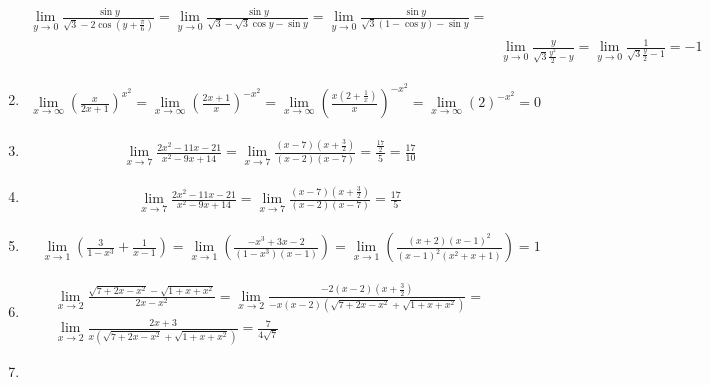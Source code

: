 \documentclass{article}
\begin{document}
\begin{enumerate}
\begin{align*}
        \lim\limits_{y \to 0}{\frac{\sin y}{\sqrt{3} - 2\cos (y + \frac{\pi}{6})}} =
        \lim\limits_{y \to 0}{\frac{\sin y}{\sqrt{3} - \sqrt{3}\cos y - \sin y}} = 
        \lim\limits_{y \to 0}{\frac{\sin y}{\sqrt{3}(1 - \cos y) - \sin y}} = \\
        &\lim\limits_{y \to 0}{\frac{ y}{\sqrt{3}\frac{y^{2}}{2} - y}} =
        \lim\limits_{y \to 0}{\frac{ 1}{\sqrt{3}\frac{y}{2} - 1}} = -1
    \end{align*}
    \item 
    \begin{align*}
       \lim\limits_{x \to \infty}{\left(\frac{x}{2x + 1}\right)^{x^{2}}} = \lim\limits_{x \to \infty}{\left(\frac{2x + 1}{x}\right)^{-x^{2}}} = \lim\limits_{x \to \infty}{\left(\frac{x(2 + \frac{1}{x})}{x}\right)^{-x^{2}}} = \lim\limits_{x \to \infty}{\left(2\right)^{-x^{2}}} = 0
    \end{align*}
    \item 
    \begin{align*}
        & \lim\limits_{x \to 7}{\frac{2 x^{2} - 11x - 21}{x^{2} - 9x + 14}} = 
         \lim\limits_{x \to 7}{\frac{(x - 7)(x + \frac{3}{2})}{(x - 2)(x - 7)}} = \frac{\frac{17}{2}}{5} = \frac{17}{10}
    \end{align*}
    \item 
    \begin{align*}
        & \lim\limits_{x \to 7}{\frac{2x^{2} - 11x - 21}{x^{2} - 9x + 14}} = \lim\limits_{x \to 7}{\frac{(x - 7)(x + \frac{3}{2})}{(x - 2)(x - 7)}} = \frac{17}{5}
    \end{align*}
    \item 
    \begin{align*}
        &\lim\limits_{x \to 1}{(\frac{3}{1 - x^{3}} + \frac{1}{x - 1})} =
        \lim\limits_{x \to 1}{(\frac{-x^{3} + 3x - 2}{(1 - x^{3})(x - 1)})} =
        \lim\limits_{x \to 1}{(\frac{(x + 2)(x - 1)^{2}}{(x - 1)^{2}(x^{2}+ x + 1)})} = 1
    \end{align*}
    \item 
    \begin{align*}
        &\lim\limits_{x \to 2}{\frac{\sqrt{7 + 2x - x^{2}} - \sqrt{1 + x + x^{2}}}{2x - x^{2}}} = 
        \lim\limits_{x \to 2}{\frac{-2(x - 2)(x + \frac{3}{2})}{-x(x - 2)(\sqrt{7 + 2x - x^{2}} + \sqrt{1 + x + x^{2}})}} = \\
        &\lim\limits_{x \to 2}{\frac{2x + 3}{x(\sqrt{7 + 2x - x^{2}} + \sqrt{1 + x + x^{2}})}} = \frac{7}{4\sqrt{7}}
    \end{align*}
    \item 

\end{enumerate}
\end{document}
